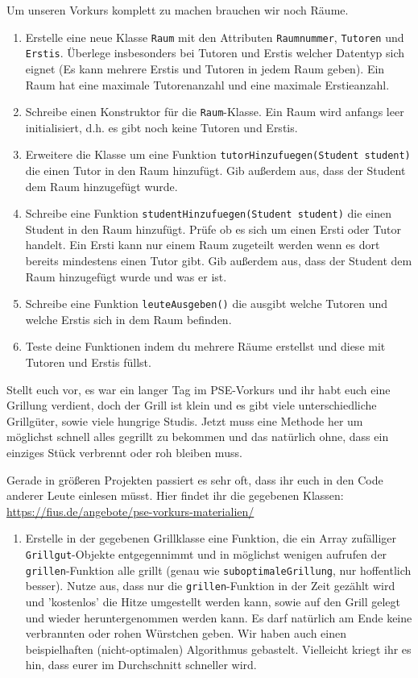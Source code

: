 \documentclass{../../sheet}
\begin{document}
Um unseren Vorkurs komplett zu machen brauchen wir noch Räume.
\begin{enumerate}
    \item Erstelle eine neue Klasse \texttt{Raum} mit den Attributen \texttt{Raumnummer}, \texttt{Tutoren} und \texttt{Erstis}. Überlege insbesonders bei Tutoren und Erstis welcher Datentyp sich eignet (Es kann mehrere Erstis und Tutoren in jedem Raum geben). Ein Raum hat eine maximale Tutorenanzahl und eine maximale Erstieanzahl.
    \item Schreibe einen Konstruktor für die \texttt{Raum}-Klasse. Ein Raum wird anfangs leer initialisiert, d.h. es gibt noch keine Tutoren und Erstis. 
    \item Erweitere die Klasse um eine Funktion \texttt{tutorHinzufuegen(Student student)} die einen Tutor in den Raum hinzufügt. Gib außerdem aus, dass der Student dem Raum hinzugefügt wurde.
    \item Schreibe eine Funktion \texttt{studentHinzufuegen(Student student)} die einen Student in den Raum hinzufügt. Prüfe ob es sich um einen Ersti oder Tutor handelt. Ein Ersti kann nur einem Raum zugeteilt werden wenn es dort bereits mindestens einen Tutor gibt. Gib außerdem aus, dass der Student dem Raum hinzugefügt wurde und was er ist.
    \item Schreibe eine Funktion \texttt{leuteAusgeben()} die ausgibt welche Tutoren und welche Erstis sich in dem Raum befinden.
    \item Teste deine Funktionen indem du mehrere Räume erstellst und diese mit Tutoren und Erstis füllst.
\end{enumerate}

\newpage
{}
Stellt euch vor, es war ein langer Tag im PSE-Vorkurs und ihr habt euch eine Grillung verdient, doch der Grill ist klein und es gibt viele unterschiedliche Grillgüter, sowie viele hungrige Studis. Jetzt muss eine Methode her um möglichst schnell alles gegrillt zu bekommen und das natürlich ohne, dass ein einziges Stück verbrennt oder roh bleiben muss.

Gerade in größeren Projekten passiert es sehr oft, dass ihr euch in den Code anderer Leute einlesen müsst. Hier findet ihr die gegebenen Klassen: \\\url{https://fius.de/angebote/pse-vorkurs-materialien/}
\begin{enumerate}
    \item Erstelle in der gegebenen Grillklasse eine Funktion, die ein Array zufälliger \texttt{Grillgut}-Objekte entgegennimmt und in möglichst wenigen aufrufen der \texttt{grillen}-Funktion alle grillt (genau wie \texttt{suboptimaleGrillung}, nur hoffentlich besser). Nutze aus, dass nur die \texttt{grillen}-Funktion in der Zeit gezählt wird und 'kostenlos' die Hitze umgestellt werden kann, sowie auf den Grill gelegt und wieder heruntergenommen werden kann. Es darf natürlich am Ende keine verbrannten oder rohen Würstchen geben. Wir haben auch einen beispielhaften (nicht-optimalen) Algorithmus gebastelt. Vielleicht kriegt ihr es hin, dass eurer im Durchschnitt schneller wird.
\end{enumerate}
\end{document}
